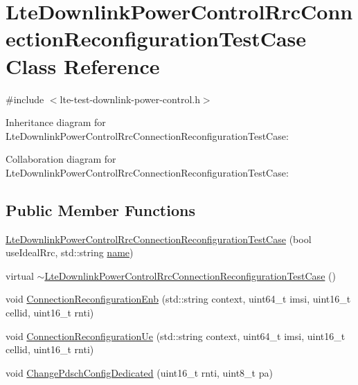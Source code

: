 \hypertarget{classLteDownlinkPowerControlRrcConnectionReconfigurationTestCase}{}\section{Lte\+Downlink\+Power\+Control\+Rrc\+Connection\+Reconfiguration\+Test\+Case Class Reference}
\label{classLteDownlinkPowerControlRrcConnectionReconfigurationTestCase}


{\ttfamily \#include $<$lte-\/test-\/downlink-\/power-\/control.\+h$>$}



Inheritance diagram for Lte\+Downlink\+Power\+Control\+Rrc\+Connection\+Reconfiguration\+Test\+Case\+:


Collaboration diagram for Lte\+Downlink\+Power\+Control\+Rrc\+Connection\+Reconfiguration\+Test\+Case\+:
\subsection*{Public Member Functions}
\begin{DoxyCompactItemize}
\item 
\hyperlink{classLteDownlinkPowerControlRrcConnectionReconfigurationTestCase_a701b561aa16815f4175d84f162237251}{Lte\+Downlink\+Power\+Control\+Rrc\+Connection\+Reconfiguration\+Test\+Case} (bool use\+Ideal\+Rrc, std\+::string \hyperlink{generate__test__data__lte__spectrum__model_8m_ab74e6bf80237ddc4109968cedc58c151}{name})
\item 
virtual \hyperlink{classLteDownlinkPowerControlRrcConnectionReconfigurationTestCase_a41edf698e4bb9f90bada3804809a8de8}{$\sim$\+Lte\+Downlink\+Power\+Control\+Rrc\+Connection\+Reconfiguration\+Test\+Case} ()
\item 
void \hyperlink{classLteDownlinkPowerControlRrcConnectionReconfigurationTestCase_a2fc3a4b704f7edd868bde7f82f6894dd}{Connection\+Reconfiguration\+Enb} (std\+::string context, uint64\+\_\+t imsi, uint16\+\_\+t cellid, uint16\+\_\+t rnti)
\item 
void \hyperlink{classLteDownlinkPowerControlRrcConnectionReconfigurationTestCase_a800bcd9272d5dd90b6184b0393a8e987}{Connection\+Reconfiguration\+Ue} (std\+::string context, uint64\+\_\+t imsi, uint16\+\_\+t cellid, uint16\+\_\+t rnti)
\item 
void \hyperlink{classLteDownlinkPowerControlRrcConnectionReconfigurationTestCase_acc40854ede33bf15dd45204dad149e61}{Change\+Pdsch\+Config\+Dedicated} (uint16\+\_\+t rnti, uint8\+\_\+t pa)
\end{DoxyCompactItemize}
